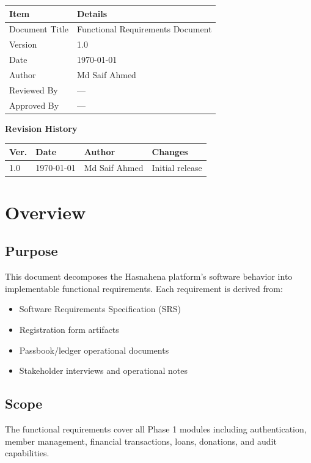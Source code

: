 \documentclass[11pt,a4paper]{article}
\newcommand{\DocumentTitle}{Functional Requirements Document}
\newcommand{\DocumentVersion}{1.0}
\newcommand{\DocumentDate}{\today}
\begin{document}
\begin{tabular}{@{}p{3cm}p{10cm}@{}}
\toprule
\textbf{Item} & \textbf{Details} \\
\midrule
Document Title & \DocumentTitle \\
Version & \DocumentVersion \\
Date & \DocumentDate \\
Author & Md Saif Ahmed \\
Reviewed By & --- \\
Approved By & --- \\
\bottomrule
\end{tabular}

\vspace{1em}

\textbf{Revision History}

\begin{tabular}{@{}p{1.2cm}p{2.5cm}p{3.5cm}p{5.5cm}@{}}
\toprule
\textbf{Ver.} & \textbf{Date} & \textbf{Author} & \textbf{Changes} \\
\midrule
1.0 & \DocumentDate & Md Saif Ahmed & Initial release \\
\bottomrule
\end{tabular}

\newpage

\section{Overview}

\subsection{Purpose}
This document decomposes the Hasnahena platform's software behavior into implementable functional requirements. Each requirement is derived from:
\begin{itemize}
    \item Software Requirements Specification (SRS)
    \item Registration form artifacts
    \item Passbook/ledger operational documents
    \item Stakeholder interviews and operational notes
\end{itemize}

\subsection{Scope}
The functional requirements cover all Phase 1 modules including authentication, member management, financial transactions, loans, donations, and audit capabilities.
\end{document}
